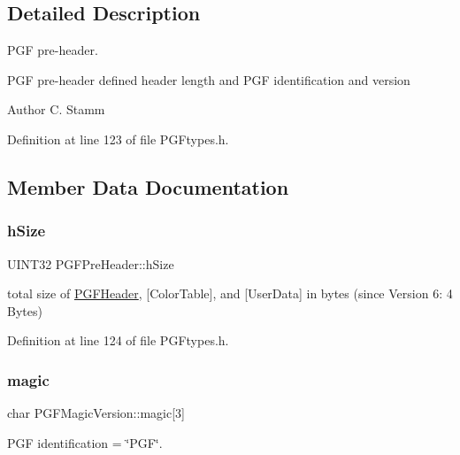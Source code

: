 \subsection{Detailed Description}
P\+GF pre-\/header. 

P\+GF pre-\/header defined header length and P\+GF identification and version \begin{DoxyAuthor}{Author}
C. Stamm 
\end{DoxyAuthor}


Definition at line 123 of file P\+G\+Ftypes.\+h.



\subsection{Member Data Documentation}
\mbox{\label{structPGFPreHeader_a71b1463b71b722459dad25a3ef0b492b}} 
\subsubsection{\texorpdfstring{hSize}{hSize}}
{\footnotesize\ttfamily U\+I\+N\+T32 P\+G\+F\+Pre\+Header\+::h\+Size}



total size of \mbox{\hyperlink{structPGFHeader}{P\+G\+F\+Header}}, \mbox{[}Color\+Table\mbox{]}, and \mbox{[}User\+Data\mbox{]} in bytes (since Version 6\+: 4 Bytes) 



Definition at line 124 of file P\+G\+Ftypes.\+h.

\mbox{\label{structPGFMagicVersion_a8b27eabb723f35b4fdb9e357e69b334b}} 
\subsubsection{\texorpdfstring{magic}{magic}}
{\footnotesize\ttfamily char P\+G\+F\+Magic\+Version\+::magic\mbox{[}3\mbox{]}\hspace{0.3cm}{\ttfamily [inherited]}}



P\+GF identification = \char`\"{}\+P\+G\+F\char`\"{}. 



